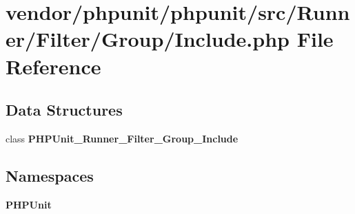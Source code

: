 \section{vendor/phpunit/phpunit/src/\+Runner/\+Filter/\+Group/\+Include.php File Reference}
\label{_include_8php}
\subsection*{Data Structures}
\begin{DoxyCompactItemize}
\item 
class {\bf P\+H\+P\+Unit\+\_\+\+Runner\+\_\+\+Filter\+\_\+\+Group\+\_\+\+Include}
\end{DoxyCompactItemize}
\subsection*{Namespaces}
\begin{DoxyCompactItemize}
\item 
 {\bf P\+H\+P\+Unit}
\end{DoxyCompactItemize}
